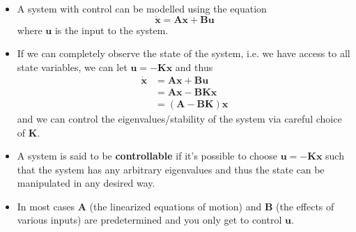 \documentclass{article}
\renewcommand{\vec}[1]{\boldsymbol{\mathbf{#1}}}
\newcommand{\dvec}[1]{\dot{\vec{#1}}}
\begin{document}
\begin{itemize}
  \item A system with control can be modelled using the equation \[\dvec{x} = \vec{A} \vec{x} + \vec{B} \vec{u}\] where $\vec{u}$ is the input to the system.

  \item If we can completely observe the state of the system, i.e. we have access to all state variables, we can let $\vec{u} = -\vec{K} \vec{x}$ and thus \begin{align*}
          \dvec{x} & = \vec{A} \vec{x} + \vec{B} \vec{u}         \\
                   & = \vec{A} \vec{x} - \vec{B} \vec{K} \vec{x} \\
                   & = (\vec{A} - \vec{B} \vec{K}) \vec{x}
        \end{align*} and we can control the eigenvalues/stability of the system via careful choice of $\vec{K}$.

  \item A system is said to be \textbf{controllable} if it's possible to choose $\vec{u} = -\vec{K} \vec{x}$ such that the system has any arbitrary eigenvalues and thus the state can be manipulated in any desired way.

  \item In most cases $\vec{A}$ (the linearized equations of motion) and $\vec{B}$ (the effects of various inputs) are predetermined and you only get to control $\vec{u}$.


\end{itemize}
\end{document}
